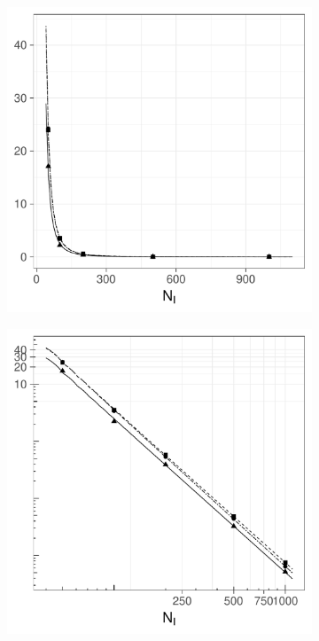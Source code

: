 \begin{figure}[htbp]
    \begin{subfigure}[b]{0.49\textwidth}
        \includegraphics[width=\textwidth]{results/by_pop_size/NMISE-vs-population}
        \caption{}
        \label{fig:ise:unifNpop_1h:nmise}
    \end{subfigure}
    \begin{subfigure}[b]{0.49\textwidth}
        \includegraphics[width=\textwidth]{results/by_pop_size/NMISE-vs-population-log-log}

\end{subfigure}
\end{figure}
